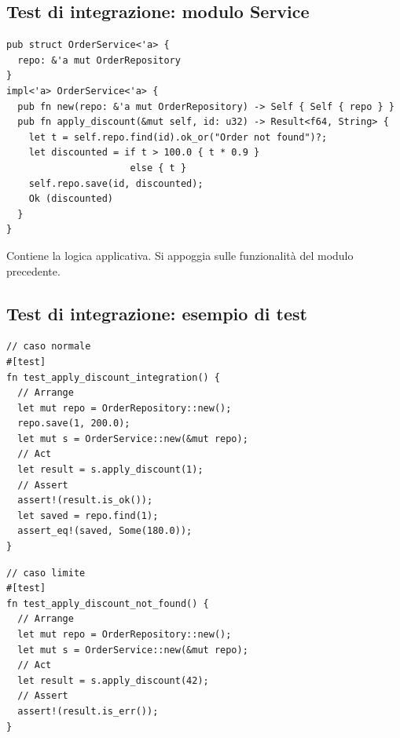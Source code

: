 \subsection{Test di integrazione: modulo Service}

\begin{center}
  \begin{minipage}{0.7\linewidth}
    \begin{verbatim}
pub struct OrderService<'a> {
  repo: &'a mut OrderRepository
}
impl<'a> OrderService<'a> {
  pub fn new(repo: &'a mut OrderRepository) -> Self { Self { repo } }
  pub fn apply_discount(&mut self, id: u32) -> Result<f64, String> {
    let t = self.repo.find(id).ok_or("Order not found")?;
    let discounted = if t > 100.0 { t * 0.9 }
                      else { t }
    self.repo.save(id, discounted);
    Ok (discounted)
  }
}
\end{verbatim}
  \end{minipage}%
  \hfill
  \begin{minipage}{0.25\linewidth}
    Contiene la logica applicativa. Si appoggia sulle funzionalità del
    modulo precedente.

  \end{minipage}
\end{center}

\subsection{Test di integrazione: esempio di test}


\begin{center}
  \begin{minipage}{0.47\linewidth}
    \begin{verbatim}
// caso normale
#[test]
fn test_apply_discount_integration() {
  // Arrange
  let mut repo = OrderRepository::new();
  repo.save(1, 200.0);
  let mut s = OrderService::new(&mut repo);
  // Act
  let result = s.apply_discount(1);
  // Assert
  assert!(result.is_ok());
  let saved = repo.find(1);
  assert_eq!(saved, Some(180.0));
}
\end{verbatim}

  \end{minipage}
  \hfill
  \begin{minipage}{0.47\linewidth}
    \begin{verbatim}
// caso limite
#[test]
fn test_apply_discount_not_found() {
  // Arrange
  let mut repo = OrderRepository::new();
  let mut s = OrderService::new(&mut repo);
  // Act
  let result = s.apply_discount(42);
  // Assert
  assert!(result.is_err());
}
\end{verbatim}

  \end{minipage}
\end{center}


